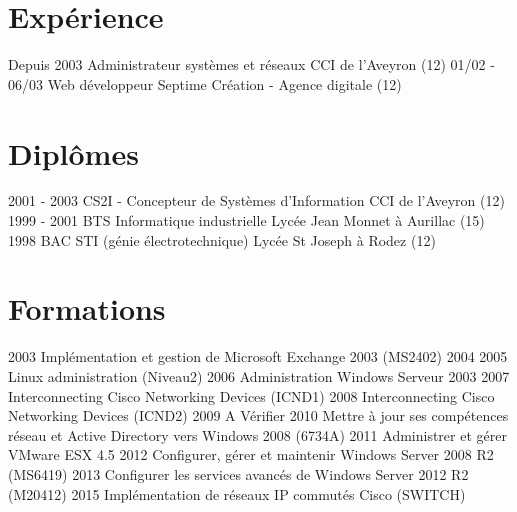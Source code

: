 \documentclass[]{friggeri-cv}
\begin{document}
\section{Expérience}
\begin{entrylist}
  \entry
    {Depuis 2003}
    {Administrateur systèmes et réseaux}
    {CCI de l'Aveyron (12)}
    {}
  \entry
    {01/02 - 06/03}
    {Web développeur }
    {Septime Création - Agence digitale (12)}
    {}
\end{entrylist}
\section{Diplômes}
\begin{entrylist}
  \entry
    {2001 - 2003}
    {CS2I - Concepteur de Systèmes d’Information}
    {CCI de l'Aveyron (12)}
    {}
  \entry
    {1999 - 2001}
    {BTS Informatique industrielle}
    {Lycée Jean Monnet à Aurillac (15)}
    {}
  \entry
    {1998}
    {BAC STI (génie électrotechnique)}
    {Lycée St Joseph à Rodez (12)}
    {}
\end{entrylist}
\section{Formations}
\begin{entrylist}
  \entry
    {2003}
    {Implémentation et gestion de Microsoft Exchange 2003 (MS2402)}
    {}
    {}
  \entry
    {2004}
    {}
    {}
    {}
  \entry
    {2005}
    {Linux administration (Niveau2)}
    {}
    {}
  \entry
    {2006}
    {Administration Windows Serveur 2003}
    {}
    {}
  \entry
    {2007}
    {Interconnecting Cisco Networking Devices (ICND1)}
    {}
    {}
  \entry
    {2008}
     {Interconnecting Cisco Networking Devices (ICND2)}
    {}
    {}
  \entry
    {2009}
    {A Vérifier}
    {}
    {}
  \entry
    {2010}
    {Mettre à jour ses compétences réseau et Active Directory vers Windows 2008 (6734A)}
    {}
    {}
  \entry
    {2011}
    {Administrer et gérer  VMware ESX 4.5}
    {}
    {}
    \entry
    {2012}
    {Configurer, gérer et maintenir Windows Server 2008 R2 (MS6419)}
    {}
    {}
   \entry
    {2013}
    {Configurer les services avancés de Windows Server 2012 R2 (M20412)}
    {}
    {}
  \entry
    {2015}
    {Implémentation de réseaux IP commutés Cisco (SWITCH)}
    {}
    {}
\end{entrylist}
\end{document}
